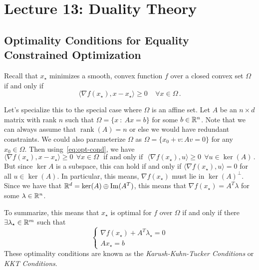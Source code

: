\documentclass[12pt]{article}
\begin{document}
\maketitle

\section{Lecture 13: Duality Theory}


\subsection{Optimality Conditions for Equality Constrained Optimization}

Recall that $x_\star$ minimizes a smooth, convex function $f$ over a closed convex set $\Omega$ if and only if 
 \begin{equation}\label{eq:opt-cond}
  \langle \nabla f(x_\star), x - x_\star \rangle \geq 0 \;\;\;\; \forall x \in \Omega\,.
 \end{equation}

Let's specialize this to the special case where $\Omega$ is an affine set.  Let $A$ be an $n\times d$ matrix with rank $n$ such that $\Omega =\{x~:~Ax=b\}$ for some $b\in \mathbb{R}^n$.  Note that we can always assume that $\operatorname{rank}(A) = n$ or else we would have redundant constraints. We could also parameterize $\Omega$ as  $\Omega = \{x_0 + v : Av= 0\}$ for any $x_0\in \Omega$.  Then using~\eqref{eq:opt-cond}, we have
  \begin{equation*} 
  \langle \nabla f(x_\star), x - x_\star \rangle \geq 0  ~~\forall x \in \Omega~~~\mbox{if and only if}~~~
    \langle \nabla f(x_\star), u \rangle \geq 0 ~~\forall u \in \operatorname{ker}(A)\,.
    \end{equation*}
But since $\operatorname{ker}{A}$ is a subspace, this can hold if and only if  $\langle \nabla f(x_\star), u \rangle = 0$ for all $u \in \operatorname{ker}(A)$.  In particular, this means, $\nabla f(x_\star)$ must lie in $\operatorname{ker}(A)^\perp$.  Since we have that $\mathbb{R}^d = \operatorname{ker}(A) \oplus \operatorname{Im}(A^T)$, this means that $\nabla f(x_\star) = A^T \lambda$ for some $\lambda \in \mathbb{R}^n$.

To summarize, this means that $x_\star$ is optimal for $f$ over $\Omega$ if and only if there $\exists \lambda_\star \in \mathbb{R}^m$ such that 
$$ \begin{cases}
   \nabla f(x_\star) + A^T \lambda_\star  = 0\\
  Ax_\star = b 
  \end{cases}$$
These optimality conditions are known as the \emph{Karush-Kuhn-Tucker Conditions} or \emph{KKT Conditions}.
\end{document}
